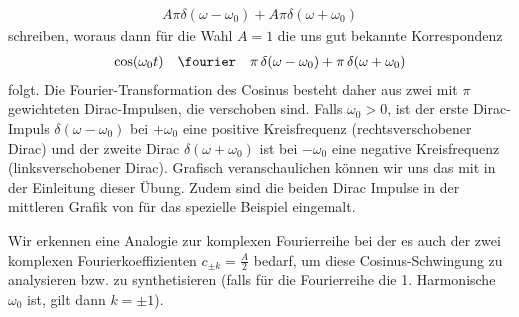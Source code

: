 \begin{mdframed}
\begin{align}
A \pi \delta(\omega-\omega_0) + A \pi \delta(\omega+\omega_0)
\end{align}
schreiben, woraus dann für die Wahl $A=1$ die uns gut bekannte Korrespondenz
\begin{align}
\cos(\omega_0 t) \quad\fourier\quad \pi \, \delta(\omega-\omega_0) + \pi \, \delta(\omega+\omega_0)
\end{align}
folgt.
%
Die Fourier-Transformation des Cosinus besteht daher aus zwei mit $\pi$ gewichteten
Dirac-Impulsen, die verschoben sind. Falls $\omega_0>0$, ist der erste
Dirac-Impuls $\delta(\omega-\omega_0)$ bei $+\omega_0$ eine positive Kreisfrequenz
(rechtsverschobener Dirac)
und der zweite Dirac $\delta(\omega+\omega_0)$ ist bei $-\omega_0$ eine
negative Kreisfrequenz (linksverschobener Dirac).
%
Grafisch veranschaulichen können wir uns das mit 
in der Einleitung dieser Übung.
%
Zudem sind die beiden Dirac Impulse in der mittleren Grafik von
 für das spezielle Beispiel eingemalt.
%

Wir erkennen eine Analogie zur komplexen Fourierreihe bei der es auch der
zwei komplexen Fourierkoeffizienten $c_{\pm k} = \frac{A}{2}$ bedarf, um diese
Cosinus-Schwingung zu analysieren bzw. zu synthetisieren (falls für die
Fourierreihe die 1. Harmonische $\omega_0$ ist, gilt dann $k=\pm 1$).
\end{mdframed}



